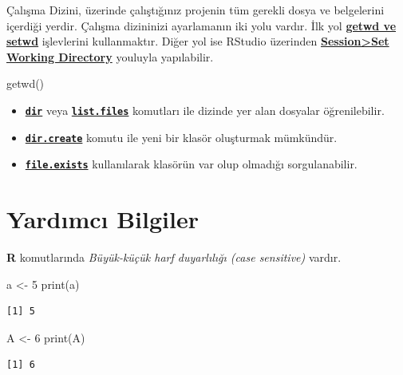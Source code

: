 \documentclass[
  letterpaper,
  DIV=11,
  numbers=noendperiod]{scrreprt}
\newenvironment{Shaded}{\begin{snugshade}}{\end{snugshade}}
\newcommand{\DecValTok}[1]{\textcolor[rgb]{0.68,0.00,0.00}{#1}}
\newcommand{\FunctionTok}[1]{\textcolor[rgb]{0.28,0.35,0.67}{#1}}
\newcommand{\NormalTok}[1]{\textcolor[rgb]{0.00,0.23,0.31}{#1}}
\newcommand{\OtherTok}[1]{\textcolor[rgb]{0.00,0.23,0.31}{#1}}
\begin{document}
Çalışma Dizini, üzerinde çalıştığınız projenin tüm gerekli dosya ve
belgelerini içerdiği yerdir. Çalışma dizininizi ayarlamanın iki yolu
vardır. İlk yol \ul{\textbf{getwd ve setwd}} işlevlerini kullanmaktır.
Diğer yol ise RStudio üzerinden \ul{\textbf{Session\textgreater Set
Working Directory}} youluyla yapılabilir.

\begin{Shaded}
\begin{Highlighting}[]
\FunctionTok{getwd}\NormalTok{()}
\end{Highlighting}
\end{Shaded}

\begin{itemize}
\item
  \ul{\textbf{\texttt{dir}}} veya \ul{\textbf{\texttt{list.files}}}
  komutları ile dizinde yer alan dosyalar öğrenilebilir.
\item
  \ul{\textbf{\texttt{dir.create}}} komutu ile yeni bir klasör
  oluşturmak mümkündür.
\item
  \ul{\textbf{\texttt{file.exists}}} kullanılarak klasörün var olup
  olmadığı sorgulanabilir.
\end{itemize}

\section{Yardımcı Bilgiler}\label{yardux131mcux131-bilgiler}

\textbf{R} komutlarında \emph{Büyük-küçük harf duyarlılığı (case
sensitive)} vardır.

\begin{Shaded}
\begin{Highlighting}[]
\NormalTok{a }\OtherTok{\textless{}{-}} \DecValTok{5}  
\FunctionTok{print}\NormalTok{(a)  }
\end{Highlighting}
\end{Shaded}

\begin{verbatim}
[1] 5
\end{verbatim}

\begin{Shaded}
\begin{Highlighting}[]
\NormalTok{A }\OtherTok{\textless{}{-}} \DecValTok{6}  
\FunctionTok{print}\NormalTok{(A) }
\end{Highlighting}
\end{Shaded}

\begin{verbatim}
[1] 6
\end{verbatim}
\end{document}
